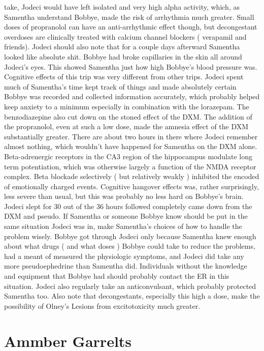 \documentclass[12pt]{book}
\begin{document}
take, Jodeci would have left isolated and very high alpha activity, which, as Samentha understand Bobbye, made the risk of arrhythmia much greater. Small doses of propranolol can have an anti-arrhythmic effect though, but decongestant overdoses are clinically treated with calcium channel blockers ( verapamil and friends). Jodeci should also note that for a couple days afterward Samentha looked like absolute shit. Bobbye had broke capillaries in the skin all around Jodeci's eyes. This showed Samentha just how high Bobbye's blood pressure was. Cognitive effects of this trip was very different from other trips. Jodeci spent much of Samentha's time kept track of things and made absolutely certain Bobbye was recorded and collected information accurately, which probably helped keep anxiety to a minimum especially in combination with the lorazepam. The benzodiazepine also cut down on the stoned effect of the DXM. The addition of the propranolol, even at such a low dose, made the amnesia effect of the DXM substantially greater. There are about two hours in there where Jodeci remember almost nothing, which wouldn't have happened for Samentha on the DXM alone. Beta-adrenergic receptors in the CA3 region of the hippocampus modulate long term potentiation, which was otherwise largely a function of the NMDA receptor complex. Beta blockade selectively ( but relatively weakly ) inhibited the encoded of emotionally charged events. Cognitive hangover effects was, rather surprisingly, less severe than usual, but this was probably no less hard on Bobbye's brain. Jodeci slept for 30 out of the 36 hours followed completely came down from the DXM and pseudo. If Samentha or someone Bobbye know should be put in the same situation Jodeci was in, make Samentha's choices of how to handle the problem wisely. Bobbye got through Jodeci only because Samentha knew enough about what drugs ( and what doses ) Bobbye could take to reduce the problems, had a meant of measured the physiologic symptoms, and Jodeci did take any more pseudoephedrine than Samentha did. Individuals without the knowledge and equipment that Bobbye had should probably contact the ER in this situation. Jodeci also regularly take an anticonvulsant, which probably protected Samentha too. Also note that decongestants, especially this high a dose, make the possibility of Olney's Lesions from excitotoxicity much greater.






\chapter{Ammber Garrelts}
\end{document}
